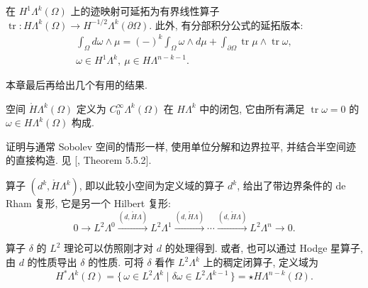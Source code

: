 \begin{Theorem}\label{thm:forms-weak-trace-extension}
{在 $H^1\Lambda^k(\Omega)$ 上的迹映射可延拓为有界线性算子 $\operatorname{tr}:H\Lambda^k(\Omega)\to H^{-1/2}\Lambda^k(\partial\Omega)$. 此外, 有分部积分公式的延拓版本:}
\begin{equation}\label{eq:forms-extended-integration-by-parts}
\begin{gathered}
\int_\Omega d\omega\wedge\mu=(-)^k\int_\Omega\omega\wedge d\mu+\int_{\partial\Omega}\operatorname{tr}\mu\wedge\operatorname{tr}\omega,\\
\omega\in H^1\Lambda^k,\ \mu\in H\Lambda^{n-k-1}.
\end{gathered}
\end{equation}
\end{Theorem}

{本章最后再给出几个有用的结果.}

\begin{Theorem}\label{thm:forms-zero-trace-characterization}
{空间 $\mathring H\Lambda^k(\Omega)$ 定义为 $C_0^\infty\Lambda^k(\Omega)$ 在 $H\Lambda^k$ 中的闭包, 它由所有满足 $\operatorname{tr}\omega=0$ 的 $\omega\in H\Lambda^k(\Omega)$ 构成.}
\end{Theorem}

\begin{Proof}
{证明与通常 Sobolev 空间的情形一样, 使用单位分解和边界拉平, 并结合半空间迹的直接构造. 见 [, Theorem 5.5.2].}
\end{Proof}

{算子 $(d^k,\mathring H\Lambda^k)$, 即以此较小空间为定义域的算子 $d^k$, 给出了带边界条件的 de Rham 复形, 它是另一个 Hilbert 复形:}
\begin{equation}\label{eq:boundary-manifold-de-rham-complex}
0\to L^2\Lambda^0\xrightarrow{(d,\mathring H\Lambda)}L^2\Lambda^1\xrightarrow{(d,\mathring H\Lambda)}\cdots\xrightarrow{(d,\mathring H\Lambda)}L^2\Lambda^n\to0.
\end{equation}

{算子 $\delta$ 的 $L^2$ 理论可以仿照刚才对 $d$ 的处理得到. 或者, 也可以通过 Hodge 星算子, 由 $d$ 的性质导出 $\delta$ 的性质. 可将 $\delta$ 看作 $L^2\Lambda^k$ 上的稠定闭算子, 定义域为}
\[
H^*\Lambda^k(\Omega)=\{\,\omega\in L^2\Lambda^k\mid\delta\omega\in L^2\Lambda^{k-1}\,\}=\star H\Lambda^{n-k}(\Omega).
\]

